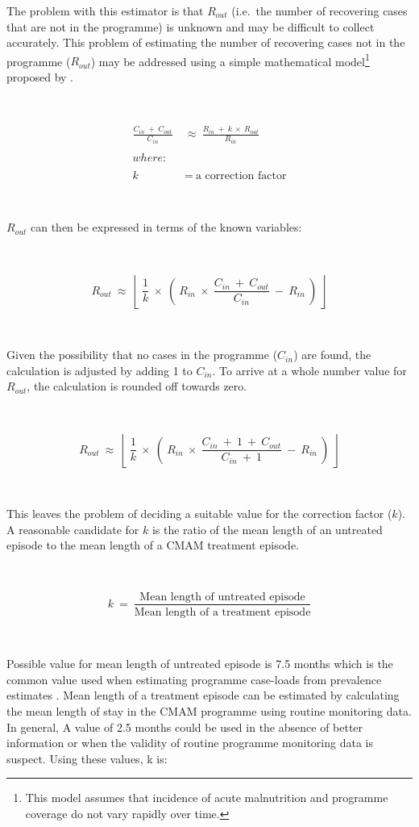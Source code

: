 \documentclass[12pt,a4paper]{book}
\let\rmarkdownfootnote\footnote%
\def\footnote{\protect\rmarkdownfootnote}
\theoremstyle{definition}
\theoremstyle{definition}
\theoremstyle{definition}
\theoremstyle{remark}
\begin{document}
The problem with this estimator is that \(R_{out}\) (i.e.~the number of
recovering cases that are not in the programme) is unknown and may be
difficult to collect accurately. This problem of estimating the number
of recovering cases not in the programme (\(R_{out}\)) may be addressed
using a simple mathematical model\footnote{This model assumes that
  incidence of acute malnutrition and programme coverage do not vary
  rapidly over time.} proposed by \citet{Balegamire:2015ud}.

~

\[\begin{aligned}
\frac{C_{in} ~ + ~ C_{out}}{C_{in}} & ~ \approx ~ \frac{R_{in} ~ + ~ k ~ \times ~ R_{out}}{R_{in}} \\
\\
where: & \\
\\
k & ~ = ~ \text{a correction factor}
\end{aligned}\]

~

\(R_{out}\) can then be expressed in terms of the known variables:

~

\[  R_{out} ~ \approx ~ \left \lfloor ~ \frac{1}{k} ~ \times ~ \left ( ~ R_{in} ~ \times ~ \frac{C_{in} ~ + ~ C_{out}}{C_{in}} ~ - ~ R_{in} ~ \right ) ~ \right \rfloor \]

~

Given the possibility that no cases in the programme (\(C_{in}\)) are
found, the calculation is adjusted by adding 1 to \(C_{in}\). To arrive
at a whole number value for \(R_{out}\), the calculation is rounded off
towards zero.

~

\[ R_{out} ~ \approx ~ \left \lfloor ~ \frac{1}{k} ~ \times ~ \left ( ~ R_{in} ~ \times ~ \frac{C_{in} ~ + ~ 1 ~ + ~ C_{out}}{C_{in} ~ + ~ 1} ~ - ~ R_{in} ~ \right ) ~ \right \rfloor \]

~

This leaves the problem of deciding a suitable value for the correction
factor (\(k\)). A reasonable candidate for \(k\) is the ratio of the
mean length of an untreated episode to the mean length of a CMAM
treatment episode.

~

\[ k ~ = ~ \frac{\text{Mean length of untreated episode}}{\text{Mean length of a treatment episode}} \]

~

Possible value for mean length of untreated episode is 7.5 months
\citep{Garenne:2009fq} which is the common value used when estimating
programme case-loads from prevalence estimates \citep{Myatt:2012tu}.
Mean length of a treatment episode can be estimated by calculating the
mean length of stay in the CMAM programme using routine monitoring data.
In general, A value of 2.5 months could be used in the absence of better
information or when the validity of routine programme monitoring data is
suspect. Using these values, k is:
\end{document}

